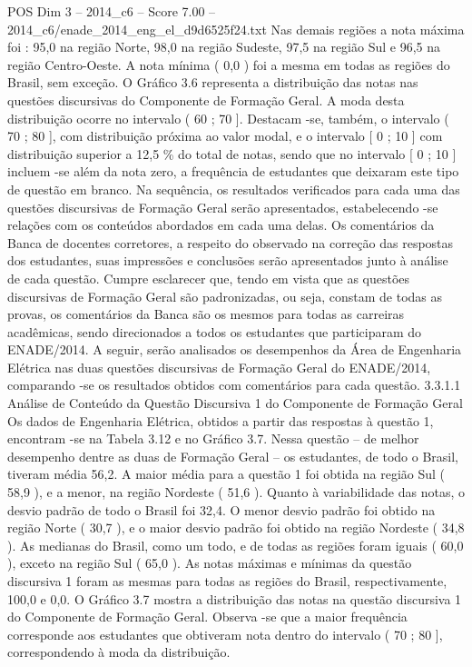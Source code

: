 \begin{textsample}{POS Dim 3 – 2014\_c6 – Score 7.00 – 2014\_c6/enade\_2014\_eng\_el\_d9d6525f24.txt}
Nas demais regiões a nota máxima foi : 95,0 na região Norte, 98,0 na região Sudeste, 97,5 na região Sul e 96,5 na região Centro-Oeste.
A nota mínima ( 0,0 ) foi a mesma em todas as regiões do Brasil, sem exceção.
O Gráfico 3.6 representa a distribuição das notas nas questões discursivas do Componente de Formação Geral.
A moda desta distribuição ocorre no intervalo ( 60 ; 70 ].
Destacam -se, também, o intervalo ( 70 ; 80 ], com distribuição próxima ao valor modal, e o intervalo [ 0 ; 10 ] com distribuição superior a 12,5 \% do total de notas, sendo que no intervalo [ 0 ; 10 ] incluem -se além da nota zero, a frequência de estudantes que deixaram este tipo de questão em branco.
Na sequência, os resultados verificados para cada uma das questões discursivas de Formação Geral serão apresentados, estabelecendo -se relações com os conteúdos abordados em cada uma delas.
Os comentários da Banca de docentes corretores, a respeito do observado na correção das respostas dos estudantes, suas impressões e conclusões serão apresentados junto à análise de cada questão.
Cumpre esclarecer que, tendo em vista que as questões discursivas de Formação Geral são padronizadas, ou seja, constam de todas as provas, os comentários da Banca são os mesmos para todas as carreiras acadêmicas, sendo direcionados a todos os estudantes que participaram do ENADE/2014.
A seguir, serão analisados os desempenhos da Área de Engenharia Elétrica nas duas questões discursivas de Formação Geral do ENADE/2014, comparando -se os resultados obtidos com comentários para cada questão. 3.3.1.1 Análise de Conteúdo da Questão Discursiva 1 do Componente de Formação Geral Os dados de Engenharia Elétrica, obtidos a partir das respostas à questão 1, encontram -se na Tabela 3.12 e no Gráfico 3.7.
Nessa questão – de melhor desempenho dentre as duas de Formação Geral – os estudantes, de todo o Brasil, tiveram média 56,2.
A maior média para a questão 1 foi obtida na região Sul ( 58,9 ), e a menor, na região Nordeste ( 51,6 ).
Quanto à variabilidade das notas, o desvio padrão de todo o Brasil foi 32,4.
O menor desvio padrão foi obtido na região Norte ( 30,7 ), e o maior desvio padrão foi obtido na região Nordeste ( 34,8 ).
As medianas do Brasil, como um todo, e de todas as regiões foram iguais ( 60,0 ), exceto na região Sul ( 65,0 ).
As notas máximas e mínimas da questão discursiva 1 foram as mesmas para todas as regiões do Brasil, respectivamente, 100,0 e 0,0.
O Gráfico 3.7 mostra a distribuição das notas na questão discursiva 1 do Componente de Formação Geral.
Observa -se que a maior frequência corresponde aos estudantes que obtiveram nota dentro do intervalo ( 70 ; 80 ], correspondendo à moda da distribuição.

\end{textsample}
